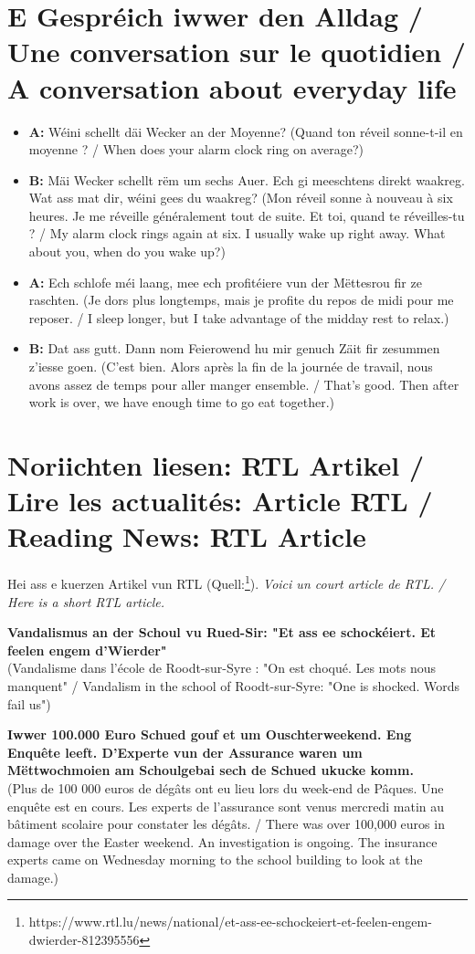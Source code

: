 \section{E Gespréich iwwer den Alldag / Une conversation sur le quotidien / A conversation about everyday life}
\begin{itemize}
    \item \textbf{A:} Wéini schellt däi Wecker an der Moyenne? (Quand ton réveil sonne-t-il en moyenne ? / When does your alarm clock ring on average?)
    \item \textbf{B:} Mäi Wecker schellt rëm um sechs Auer. Ech gi meeschtens direkt waakreg. Wat ass mat dir, wéini gees du waakreg? (Mon réveil sonne à nouveau à six heures. Je me réveille généralement tout de suite. Et toi, quand te réveilles-tu ? / My alarm clock rings again at six. I usually wake up right away. What about you, when do you wake up?)
    \item \textbf{A:} Ech schlofe méi laang, mee ech profitéiere vun der Mëttesrou fir ze raschten. (Je dors plus longtemps, mais je profite du repos de midi pour me reposer. / I sleep longer, but I take advantage of the midday rest to relax.)
    \item \textbf{B:} Dat ass gutt. Dann nom Feierowend hu mir genuch Zäit fir zesummen z'iesse goen. (C'est bien. Alors après la fin de la journée de travail, nous avons assez de temps pour aller manger ensemble. / That's good. Then after work is over, we have enough time to go eat together.)
\end{itemize}

\vspace{1cm}

\section{Noriichten liesen: RTL Artikel / Lire les actualités: Article RTL / Reading News: RTL Article}
Hei ass e kuerzen Artikel vun RTL (Quell:\footnote{https://www.rtl.lu/news/national/et-ass-ee-schockeiert-et-feelen-engem-dwierder-812395556}). \textit{Voici un court article de RTL. / Here is a short RTL article.}

\textbf{Vandalismus an der Schoul vu Rued-Sir: "Et ass ee schockéiert. Et feelen engem d'Wierder"} \\
(Vandalisme dans l'école de Roodt-sur-Syre : "On est choqué. Les mots nous manquent" / Vandalism in the school of Roodt-sur-Syre: "One is shocked. Words fail us")

\textbf{Iwwer 100.000 Euro Schued gouf et um Ouschterweekend. Eng Enquête leeft. D'Experte vun der Assurance waren um Mëttwochmoien am Schoulgebai sech de Schued ukucke komm.} \\
(Plus de 100 000 euros de dégâts ont eu lieu lors du week-end de Pâques. Une enquête est en cours. Les experts de l'assurance sont venus mercredi matin au bâtiment scolaire pour constater les dégâts. / There was over 100,000 euros in damage over the Easter weekend. An investigation is ongoing. The insurance experts came on Wednesday morning to the school building to look at the damage.)

